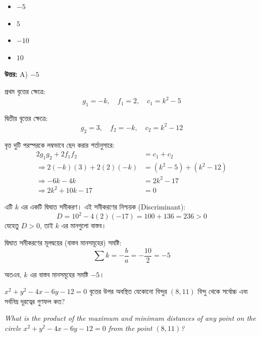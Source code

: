 \documentclass[12pt, a4paper]{article}
\begin{document}
\vspace{1em}
\begin{itemize}[label={}, leftmargin=1cm, itemsep=0.5em]
    \item[\textbf{A)}] $-5$
    \item[\textbf{B)}] $5$
    \item[\textbf{C)}] $-10$
    \item[\textbf{D)}] $10$
\end{itemize}

\vspace{0.5em}
\begin{tcolorbox}[answerbox]
    \textbf{\color{success} উত্তর:} A) $-5$
\end{tcolorbox}
\vspace{1em}

\begin{tcolorbox}[solutionbox={সমাধান (Solution)}]
    \noindent
    প্রথম বৃত্তের ক্ষেত্রে: 
    \[ g_1 = -k, \quad f_1 = 2, \quad c_1 = k^2 - 5 \]
    
    দ্বিতীয় বৃত্তের ক্ষেত্রে: 
    \[ g_2 = 3, \quad f_2 = -k, \quad c_2 = k^2 - 12 \]
    
    \vspace{0.5em}
    বৃত্ত দুটি পরস্পরকে লম্বভাবে ছেদ করার শর্তানুসারে:
    \begin{align*}
        2g_1g_2 + 2f_1f_2 &= c_1 + c_2 \\
        \Rightarrow 2(-k)(3) + 2(2)(-k) &= (k^2 - 5) + (k^2 - 12) \\
        \Rightarrow -6k - 4k &= 2k^2 - 17 \\
        \Rightarrow 2k^2 + 10k - 17 &= 0
    \end{align*}
    
    এটি $k$ এর একটি দ্বিঘাত সমীকরণ। এই সমীকরণের নিশ্চয়ক (Discriminant):
    \[ D = 10^2 - 4(2)(-17) = 100 + 136 = 236 > 0 \]
    যেহেতু $D > 0$, তাই $k$ এর মানগুলো বাস্তব। 
    
    দ্বিঘাত সমীকরণের মূলদ্বয়ের (বাস্তব মানসমূহের) সমষ্টি:
    \[ \sum k = -\frac{b}{a} = -\frac{10}{2} = -5 \]
    
    অতএব, $k$ এর বাস্তব মানসমূহের সমষ্টি \textbf{$-5$}।
\end{tcolorbox}

\vspace{2em}

\begin{tcolorbox}[questionbox={প্রশ্ন (Question) 7}]
    \noindent
    $x^2 + y^2 - 4x - 6y - 12 = 0$ বৃত্তের উপর অবস্থিত যেকোনো বিন্দুর $(8, 11)$ বিন্দু থেকে সর্বোচ্চ এবং সর্বনিম্ন দূরত্বের গুণফল কত?
    
    \vspace{0.8em}
    \begin{english}
    \noindent\textit{\color{darkgray}
    What is the product of the maximum and minimum distances of any point on the circle $x^2 + y^2 - 4x - 6y - 12 = 0$ from the point $(8, 11)$?
    }
    \end{english}
\end{tcolorbox}
\end{document}
